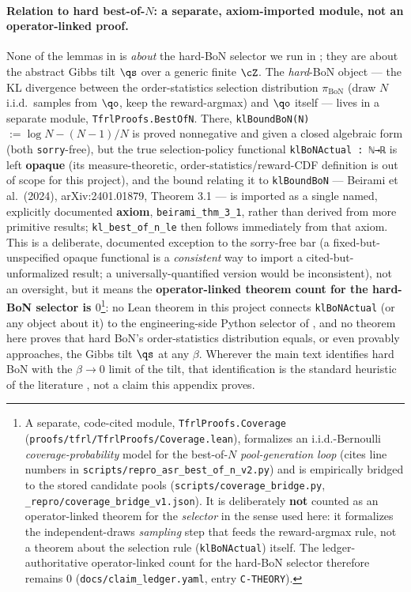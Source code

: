 \paragraph{Relation to hard best-of-$N$: a separate, axiom-imported module, not an operator-linked proof.}
None of the lemmas in  is \emph{about} the hard-BoN selector we run in
; they are about the abstract Gibbs tilt $\qs$ over a generic finite $\cZ$. The
\emph{hard}-BoN object --- the KL divergence between the order-statistics selection distribution
$\pi_{\mathrm{BoN}}$ (draw $N$ i.i.d.\ samples from $\qo$, keep the reward-argmax) and $\qo$ itself ---
lives in a separate module, \texttt{TfrlProofs.BestOfN}. There, \texttt{klBoundBoN(N)} $:=\log N-(N-1)/N$
is proved nonnegative and given a closed algebraic form (both \texttt{sorry}-free), but the true
selection-policy functional \texttt{klBoNActual : ℕ→ℝ} is left \textbf{opaque} (its measure-theoretic,
order-statistics/reward-CDF definition is out of scope for this project), and the bound relating it to
\texttt{klBoundBoN} --- Beirami et al.\ (2024), arXiv:2401.01879, Theorem 3.1 --- is imported as a
single named, explicitly documented \textbf{axiom}, \texttt{beirami\_thm\_3\_1}, rather than derived from
more primitive results; \texttt{kl\_best\_of\_n\_le} then follows immediately from that axiom. This is a
deliberate, documented exception to the sorry-free bar (a fixed-but-unspecified opaque functional is a
\emph{consistent} way to import a cited-but-unformalized result; a universally-quantified version would
be inconsistent), not an oversight, but it means the \textbf{operator-linked theorem count for the
hard-BoN selector is $0$}\footnote{A separate, code-cited module, \texttt{TfrlProofs.Coverage}
(\texttt{proofs/tfrl/TfrlProofs/Coverage.lean}), formalizes an i.i.d.-Bernoulli \emph{coverage-probability}
model for the best-of-$N$ \emph{pool-generation loop} (cites line numbers in
\texttt{scripts/repro\_asr\_best\_of\_n\_v2.py}) and is empirically bridged to the stored candidate pools
(\texttt{scripts/coverage\_bridge.py}, \texttt{\_repro/coverage\_bridge\_v1.json}). It is deliberately
\textbf{not} counted as an operator-linked theorem for the \emph{selector} in the sense used here: it
formalizes the independent-draws \emph{sampling} step that feeds the reward-argmax rule, not a theorem
about the selection rule (\texttt{klBoNActual}) itself. The ledger-authoritative operator-linked count for
the hard-BoN selector therefore remains $0$ (\texttt{docs/claim\_ledger.yaml}, entry \texttt{C-THEORY}).}:
no Lean theorem in this project connects \texttt{klBoNActual} (or any object
about it) to the engineering-side Python selector of , and no theorem here proves
that hard BoN's order-statistics distribution equals, or even provably approaches, the Gibbs tilt $\qs$
at any $\beta$. Wherever the main text identifies hard BoN with the $\beta\to0$ limit of the tilt, that
identification is the standard heuristic of the literature \citep{beirami2024bon}, not a claim this
appendix proves.

